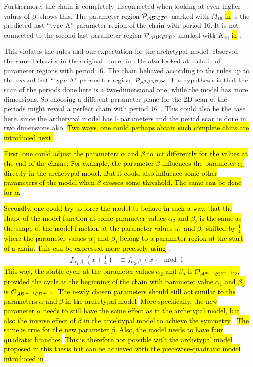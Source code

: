 Furthermore, the chain is completely disconnected when looking at even higher values of $\beta$.
 shows this.
The parameter region $\mathcal{P}_{\mathcal{A}\mathcal{B}^7\mathcal{C}\mathcal{D}^7}$ marked with $M_{16}$ \hl{in}  is the predicted last ``type A'' parameter region of the chain with period $16$.
It is not connected to the second last parameter region $\mathcal{P}_{\mathcal{A}^2\mathcal{B}^6\mathcal{C}^2\mathcal{D}^6}$ marked with $K_{16}$ \hl{in} .

This violates the rules and our expectation for the archetypal model.
 observed the same behavior in the original model in \cite{akyuz2022}.
He also looked at a chain of parameter regions with period $16$.
The chain behaved according to the rules up to the second last ``type A'' parameter region, $\mathcal{P}_{\mathcal{A}^2\mathcal{B}^6\mathcal{C}^2\mathcal{D}^6}$.
His hypothesis is that the scan of the periods done here is a two-dimensional one, while the model has more dimensions.
So choosing a different parameter plane for the 2D scan of the periods might reveal a perfect chain with period $16$~\cite{akyuz2022}.
This could also be the case here, since the archetypal model has $5$ parameters and the period scan is done in two dimensions also.
\hl{
	Two ways, one could perhaps obtain such complete chins are introduced next.
}

\hl{
	First, one could adjust the parameters $\alpha$ and $\beta$ to act differently for the values at the end of the chains.
	For example, the parameter $\beta$ influences the parameter $c_L$ directly in the archetypal model.
	But it could also influence some other parameters of the model when $\beta$ crosses some threshold.
	The same can be done for $\alpha$.
}

\hl{
	Secondly, one could try to force the model to behave in such a way, that the shape of the model function at some parameter values $\alpha_2$ and $\beta_2$ is the same as the shape of the model function at the parameter values $\alpha_1$ and $\beta_1$ shifted by $\frac{1}{4}$ where the parameter values $\alpha_1$ and $\beta_1$ belong to a parameter region at the start of a chain.
}
\hl{This can be expressed more precisely using} .
\begin{align}
	f_{\alpha_1, \beta_1}\left(x + \frac{1}{4}\right) & \equiv f_{\alpha_2, \beta_2}(x) \mod 1
	\label{equ:arch.dyn.shift}
\end{align}
\hl{
	This way, the stable cycle at the parameter values $\alpha_2$ and $\beta_2$ is $\mathcal{O}_{\mathcal{A}^{m-1}\mathcal{B}\mathcal{C}^{m-1}\mathcal{D}}$, provided the cycle at the beginning of the chain with parameter value $\alpha_1$ and $\beta_1$ is $\mathcal{O}_{\mathcal{A}\mathcal{B}^{m-1}\mathcal{C}\mathcal{D}^{m-1}}$.
	The newly chosen parameters should still act similar to the parameters $\alpha$ and $\beta$ in the archetypal model.
}
\hl{More specifically, the new parameter $\alpha$ needs to still have the same effect as in the archetypal model, but also the inverse effect of $\beta$ in the arcehtypal model to achieve the symmetry} .
\hl{
	The same is true for the new parameter $\beta$.
	Also, the model needs to have four quadratic branches.
}
\hl{This is therefore not possible with the archetypal model proposed in this thesis but can be achieved with the piecewise-quadratic model introduced in} .
